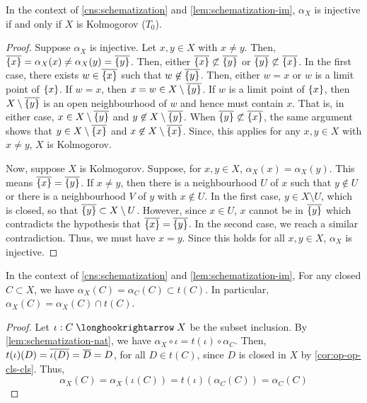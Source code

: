 \begin{lem}\label{lem:schematization-alpha-inj}
In the context of \cref{cns:schematization} and \cref{lem:schematization-im},
$\alpha_X$ is injective if and only if $X$ is Kolmogorov ($T_0$).
\end{lem}
\begin{proof}
Suppose $\alpha_X$ is injective.
Let $x, y \in X$ with $x \neq y$.
Then, $\cls{\set{x}} = \alpha_X(x) \neq \alpha_X(y) = \cls{\set{y}}$.
Then, either $\cls{\set{x}} \not\subset \cls{\set{y}}$
or $\cls{\set{y}} \not\subset \cls{\set{x}}$. In the first case,
there exists $w \in \cls{\set{x}}$ such that $w \not\in \cls{\set{y}}$.
Then, either $w = x$ or $w$ is a limit point of $\set{x}$. If $w = x$,
then $x = w \in X \setminus \cls{\set{y}}$. If $w$ is a limit point
of $\set{x}$, then $X \setminus \cls{\set{y}}$ is an open neighbourhood
of $w$ and hence must contain $x$. That is, in either case,
$x \in X \setminus \cls{\set{y}}$ and $y \not\in X \setminus \cls{\set{y}}$.
When $\cls{\set{y}} \not\subset \cls{\set{x}}$, the same argument
shows that $y \in X \setminus \cls{\set{x}}$ and
$x \not\in X \setminus \cls{\set{x}}$. Since, this applies for any
$x, y \in X$ with $x \neq y$, $X$ is Kolmogorov.

Now, suppose $X$ is Kolmogorov. Suppose, for $x, y \in X$,
$\alpha_X(x) = \alpha_X(y)$. This means $\cls{\set{x}} = \cls{\set{y}}$.
If $x \neq y$, then there is a neighbourhood $U$ of $x$ such that
$y \not\in U$ or there is a neighbourhood $V$ of $y$ with $x \not\in U$.
In the first case, $y \in X \setminus U$, which is closed, so that
$\cls{\set{y}} \subset X \setminus U$. However, since $x \in U$,
$x$ cannot be in $\cls{\set{y}}$ which contradicts the hypothesis that
$\cls{\set{x}} = \cls{\set{y}}$. In the second case, we reach a similar
contradiction. Thus, we must have $x = y$. Since this holds for
all $x, y \in X$, $\alpha_X$ is injective.
\end{proof}

\begin{lem}\label{lem:schematization-alpha-im}
In the context of \cref{cns:schematization} and \cref{lem:schematization-im},
For any closed $C \subset X$, we have $\alpha_X(C) = \alpha_C(C) \subset t(C)$.
In particular, $\alpha_X(C) = \alpha_X(C) \cap t(C)$.
\end{lem}
\begin{proof}
Let $\iota : C \hto X$ be the subset inclusion.
By \cref{lem:schematization-nat}, we have
$\alpha_X \circ \iota = t(\iota) \circ \alpha_C$. Then,
$t(\iota)(D) = \cls{\iota(D)} = \cls{D} = D$, for all $D \in t(C)$,
since $D$ is closed in $X$ by \cref{cor:op-op-cls-cls}. Thus,
\[
\alpha_X(C) = \alpha_X(\iota(C)) = t(\iota)(\alpha_C(C)) = \alpha_C(C)
\]
\end{proof}

